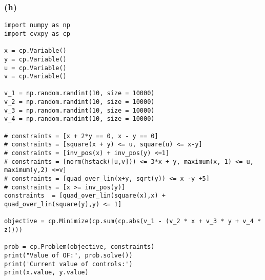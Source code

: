 \documentclass{article}
\begin{document}
\subsubsection*{(h)}
\begin{verbatim}
import numpy as np
import cvxpy as cp

x = cp.Variable()
y = cp.Variable()
u = cp.Variable()
v = cp.Variable()

v_1 = np.random.randint(10, size = 10000)
v_2 = np.random.randint(10, size = 10000)
v_3 = np.random.randint(10, size = 10000)
v_4 = np.random.randint(10, size = 10000)

# constraints = [x + 2*y == 0, x - y == 0]
# constraints = [square(x + y) <= u, square(u) <= x-y]
# constraints = [inv_pos(x) + inv_pos(y) <=1]
# constraints = [norm(hstack([u,v])) <= 3*x + y, maximum(x, 1) <= u, maximum(y,2) <=v]
# constraints = [quad_over_lin(x+y, sqrt(y)) <= x -y +5]
# constraints = [x >= inv_pos(y)]
constraints  = [quad_over_lin(square(x),x) + quad_over_lin(square(y),y) <= 1]

objective = cp.Minimize(cp.sum(cp.abs(v_1 - (v_2 * x + v_3 * y + v_4 * z))))

prob = cp.Problem(objective, constraints)
print("Value of OF:", prob.solve())
print('Current value of controls:')
print(x.value, y.value)
\end{verbatim}
\end{document}
